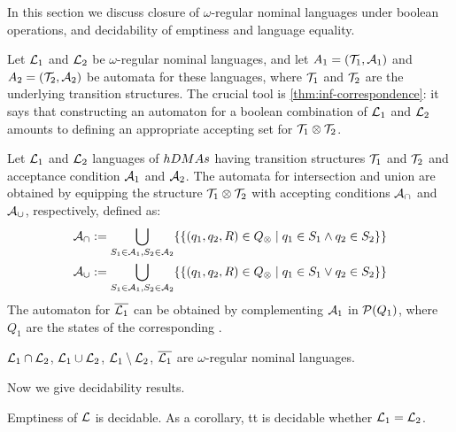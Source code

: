 \newcommand{\compl}[1]{\overline{#1}}
 
In this section we discuss closure of $\omega$-regular nominal languages under boolean operations, and decidability of emptiness and language equality.

Let $\mathcal{L}_1$ and $\mathcal{L}_2$ be $\omega$-regular nominal languages, and let $A_1 = (\mathcal{T}_1,\mathcal{A}_1)$  and $A_2 = (\mathcal{T}_2,\mathcal{A}_2)$ be automata for these languages, where $\mathcal{T}_1$ and $\mathcal{T}_2$ are the underlying transition structures.
The crucial tool is \cref{thm:inf-correspondence}: it says that constructing an automaton for a boolean combination of $\mathcal{L}_1$ and $\mathcal{L}_2$ amounts to defining an appropriate accepting set for $\mathcal{T}_1 \otimes \mathcal{T}_2$.

\begin{definition} Let $\mathcal{L}_1$ and $\mathcal{L}_2$ languages of $hDMA s$ having transition structures $\mathcal{T}_1$ and $\mathcal{T}_2$ and acceptance condition $\mathcal{A}_1$ and $\mathcal{A}_2$. The automata for intersection and union are obtained by equipping the structure $\mathcal{T}_1 \otimes \mathcal{T}_2$ with accepting conditions $\mathcal{A}_\cap$ and $\mathcal{A}_\cup$, respectively, defined as:
%
\begin{align*}
	\mathcal{A}_\cap &:= \bigcup_{S_1 \in \mathcal{A}_1,S_2 \in \mathcal{A}_2 } \{\{ (q_1,q_2,R) \in Q_{\otimes} \mid q_1 \in S_1 \land q_2 \in S_2 \}\} 
	\\
	\mathcal{A}_\cup &:= \bigcup_{S_1 \in \mathcal{A}_1,S_2 \in \mathcal{A}_2 } \{\{(q_1,q_2,R) \in Q_{\otimes} \mid q_1 \in S_1 \lor q_2 \in S_2 \}\} 
\end{align*}
%
The automaton for $\compl{\Lang_1}$ can be obtained by complementing $\mathcal{A}_1$ in $\mathcal{P}(Q_1)$, where $Q_1$ are the states of the corresponding \hdma.
\end{definition}

\begin{theorem}
$\mathcal{L}_1 \cap \mathcal{L}_2$, $\mathcal{L}_1 \cup \mathcal{L}_2$, $\mathcal{L}_1 \setminus \mathcal{L}_2$, $\compl{\Lang_1}$ are $\omega$-regular nominal languages.
\label{thm:bool-closure}
\end{theorem}
Now we give decidability results.
%
\begin{theorem}
Emptiness of $\mathcal{L}$ is decidable. As a corollary, tt is decidable whether $\mathcal{L}_1 = \mathcal{L}_2$.
\label{thm:emptiness}
\end{theorem}
